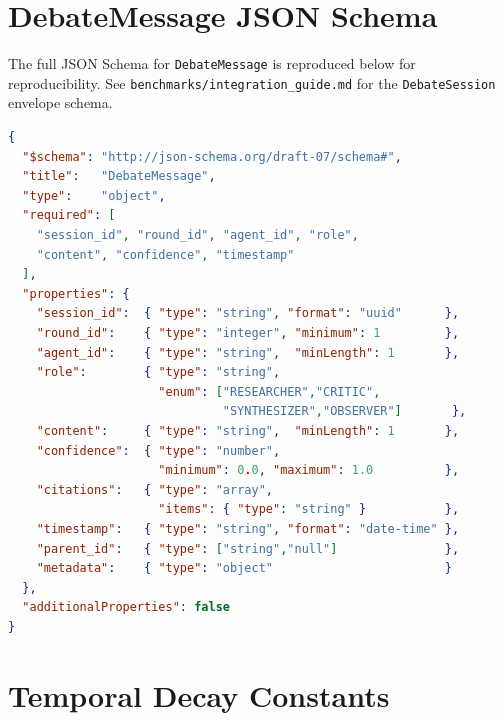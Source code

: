 \documentclass{article}
\begin{document}

\appendix

\section{DebateMessage JSON Schema}
\label{sec:schema}

The full JSON Schema for \texttt{DebateMessage} is reproduced below for
reproducibility.  See \texttt{benchmarks/integration\_guide.md} for the
\texttt{DebateSession} envelope schema.

\begin{lstlisting}[language=json, caption={DebateMessage JSON Schema (draft-07)}]
{
  "$schema": "http://json-schema.org/draft-07/schema#",
  "title":   "DebateMessage",
  "type":    "object",
  "required": [
    "session_id", "round_id", "agent_id", "role",
    "content", "confidence", "timestamp"
  ],
  "properties": {
    "session_id":  { "type": "string", "format": "uuid"      },
    "round_id":    { "type": "integer", "minimum": 1         },
    "agent_id":    { "type": "string",  "minLength": 1       },
    "role":        { "type": "string",
                     "enum": ["RESEARCHER","CRITIC",
                              "SYNTHESIZER","OBSERVER"]       },
    "content":     { "type": "string",  "minLength": 1       },
    "confidence":  { "type": "number",
                     "minimum": 0.0, "maximum": 1.0          },
    "citations":   { "type": "array",
                     "items": { "type": "string" }           },
    "timestamp":   { "type": "string", "format": "date-time" },
    "parent_id":   { "type": ["string","null"]               },
    "metadata":    { "type": "object"                        }
  },
  "additionalProperties": false
}
\end{lstlisting}

\section{Temporal Decay Constants}
\label{sec:decay_table}
\end{document}
